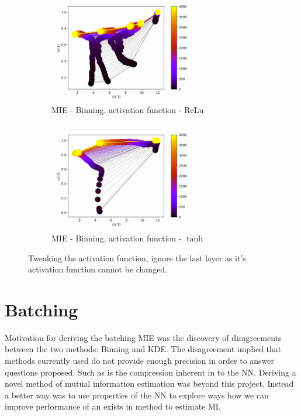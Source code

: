 \documentclass[dissertation.tex]{subfiles}
\begin{document}
\begin{figure}[ht]
  \centering
  \begin{subfigure}[t]{0.49\textwidth}
    \centering
    \includegraphics[width=0.7\textwidth]{figs/eval/activationFunction/BinningRelu.jpg}
    \caption{
      MIE - Binning, activation function - ReLu
    }
    \label{figReluTanhRelu}
  \end{subfigure}
  \begin{subfigure}[t]{0.49\textwidth}
    \centering
    \includegraphics[width=0.7\textwidth]{figs/eval/activationFunction/BinningTanh.jpg}
    \caption{
      MIE - Binning, activation function - $\tanh$
    }
    \label{figReluTanhTanh}
  \end{subfigure}
  \caption{
      Tweaking the activation function, ignore the last layer as it's
      activation function cannot be changed.
    }
  \label{figReluTanh}
\end{figure}

\section{Batching} 

Motivation for deriving the batching MIE was the discovery of disagreements
between the two methods: Binning and KDE. The disagreement implied that methods
currently used do not provide enough precision in order to answer questions
proposed. Such as is the compression inherent in to the NN.  Deriving a novel
method of mutual information estimation was beyond this project. Instead a
better way was to use properties of the NN to explore ways how we can improve
performance of an exists in method to estimate MI. 
\end{document}
